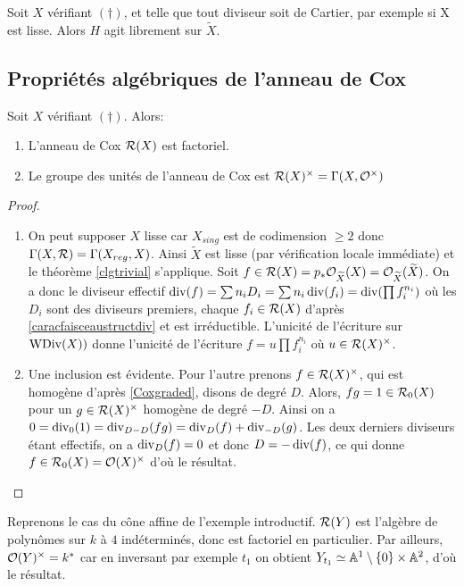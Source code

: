 \begin{cor}
Soit $X$ vérifiant $(\dagger)$, et telle que tout diviseur soit de Cartier, par exemple si X est lisse. Alors $H$ agit librement sur $\widetilde{X}$.
\end{cor}


\subsection{Propriétés algébriques de l'anneau de Cox}

\begin{prop}
Soit $X$ vérifiant $(\dagger)$. Alors:
\begin{enumerate}
\item L'anneau de Cox $\mathcal{R}(X)$ est factoriel.
\item Le groupe des unités de l'anneau de Cox est $\mathcal{R}(X)^\times=\Gamma(X,\mathcal{O}^\times)$
\end{enumerate}
\end{prop}
\begin{proof}
\begin{enumerate}
\item On peut supposer $X$ lisse car $X_{sing}$ est de codimension $\geq 2$ donc $\Gamma(X, \mathcal{R})=\Gamma(X_{reg}, X)$. Ainsi $\widetilde{X}$ est lisse (par vérification locale immédiate) et le théorème \ref{clgtrivial} s'applique. Soit $f\in \mathcal{R}(X)=p_*\mathcal{O}_{\widetilde{X}}(X)=\mathcal{O}_{\widetilde{X}}(\widetilde{X})$. On a donc le diviseur effectif $\operatorname{div}(f)= \sum n_iD_i=\sum n_i\operatorname{div}(f_i)=\operatorname{div}(\prod f_i^{n_i})$ où les $D_i$ sont des diviseurs premiers, chaque $f_i\in \mathcal{R}(X)$ d'après \ref{caracfaisceaustructdiv} et est irréductible. L'unicité de l'écriture sur $\operatorname{WDiv}(X))$ donne l'unicité de l'écriture $f=u\prod f_i^{n_i}$ où $u\in \mathcal{R}(X)^\times$.
\item Une inclusion est évidente. Pour l'autre prenons $f\in\mathcal{R}(X)^\times$, qui est homogène d'après \ref{Coxgraded}, disons de degré $D$. Alors, $fg=1\in \mathcal{R}_0(X)$ pour un $g\in\mathcal{R}(X)^\times$ homogène de degré $-D$. Ainsi on a $0=\operatorname{div}_0(1)=\operatorname{div}_{D-D}(fg)=\operatorname{div}_D(f)+\operatorname{div}_{-D}(g)$. Les deux derniers diviseurs étant effectifs, on a $\operatorname{div}_D(f)=0$ et donc $D=-\operatorname{div}(f)$, ce qui donne $f\in\mathcal{R}_0(X)=\mathcal{O}(X)^\times$ d'où le résultat.
\end{enumerate}
\end{proof}

\begin{ex}
Reprenons le cas du cône affine de l'exemple introductif.  $\mathcal{R}(Y)$ est l'algèbre de polynômes sur $k$ à $4$ indéterminés, donc est factoriel en particulier.  Par ailleurs, $\mathcal{O}(Y)^{\times}=k^*$ car en inversant par exemple $t_1$  on obtient $Y_{t_1}\simeq \mathbb{A}^{1}\setminus \lbrace0\rbrace\times\mathbb{A}^{2}$, d'où le résultat.
\end{ex}

